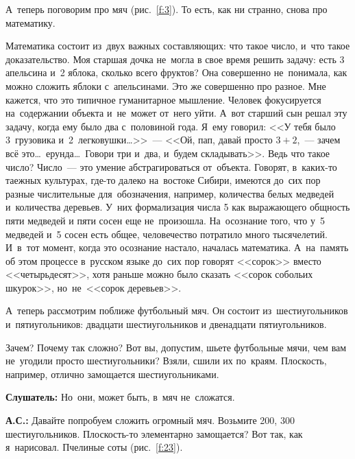 А~теперь поговорим про мяч (рис.~\ref{f:3}). То есть, как ни странно, снова про математику.

\smallskip

{\it

Математика состоит из~двух важных составляющих: что такое число, и~что такое доказательство. Моя
старшая дочка не~могла в свое время решить задачу: есть 3 апельсина и~2 яблока, сколько всего фруктов? Она
совершенно не~понимала, как можно сложить яблоки с~апельсинами. Это же совершенно про разное. Мне
кажется, что это типичное гуманитарное мышление. Человек фокусируется на~содержании объекта
и~не~может от~него уйти. А~вот старший сын решал эту задачу, когда ему было два с~половиной года. Я~ему
говорил: <<У тебя было 3~грузовика и~2~легковушки\ldots>>~--- <<Ой, пап, давай просто $3+2$,~--- зачем
всё это\ldots\ ерунда\ldots\ Говори три и~два, и~будем складывать>>. Ведь что такое число? Число~--- это умение
абстрагироваться от~объекта.
 Говорят, в~каких-то таежных культурах, где-то далеко на~востоке
Сибири, имеются до~сих пор разные числительные для~обозначения, например, количества белых медведей
и~количества деревьев. У~них формализация числа 5 как выражающего общность пяти медведей и пяти сосен
еще не~произошла. На~осознание того, что у~5 медведей и~5 сосен есть общее, человечество потратило много тысячелетий.
И~в~тот момент, когда это осознание настало, началась математика. А~на~память об
этом процессе в~русском языке до~сих пор говорят <<сорок>> вместо <<четырьдесят>>, хотя раньше можно
было сказать <<сорок собольих шкурок>>, но~не~<<сорок деревьев>>.

}

\smallskip

А~теперь рассмотрим поближе футбольный мяч. Он состоит из~шестиугольников и~пятиугольников: двадцати шестиугольников и двенадцати пятиугольников.

Зачем? Почему так сложно? Вот вы, допустим, шьете футбольные мячи, чем вам не~угодили просто
шестиугольники? Взяли, сшили их по~краям. Плоскость, например, отлично замощается шестиугольниками.

\textbf{Слушатель:} Но~они, может быть, в~мяч не~сложатся.

\pagebreak

\textbf{А.С.:} Давайте попробуем сложить огромный мяч. Возьмите 200, 300 шестиугольников.
Плоскость-то элементарно замощается? Вот так, как я~нарисовал. Пчелиные соты (рис.~\ref{f:23}).


